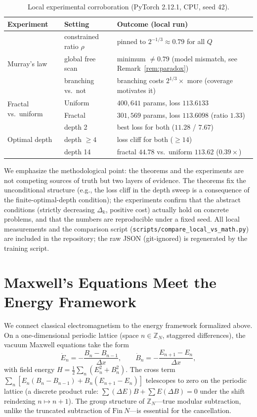 \documentclass[journal]{IEEEtran}
\begin{document}
\begin{table}[!t]
\renewcommand{\arraystretch}{1.2}
\caption{Local experimental corroboration (PyTorch 2.12.1, CPU, seed 42).}
\label{table_experiments}
\centering
\begin{tabular}{@{}ll@{}l@{}}
\toprule
Experiment & Setting & Outcome (local run) \\
\midrule
\multirow{3}{*}{Murray's law}
 & constrained ratio $\rho$ & pinned to $2^{-1/3}\approx0.79$ for all $Q$ \\
 & global free scan & minimum $\not=0.79$ (model mismatch, see Remark~\ref{rem:paradox}) \\
 & branching vs.\ not & branching costs $2^{1/3}\times$ more (coverage motivates it) \\
\midrule
\multirow{2}{*}{Fractal vs.\ uniform}
 & Uniform & $400{,}641$ params, loss $113.6133$ \\
 & Fractal & $301{,}569$ params, loss $113.6098$ (ratio $1.33$) \\
\midrule
\multirow{3}{*}{Optimal depth}
 & depth 2 & best loss for both ($11.28$ / $7.67$) \\
 & depth $\geq4$ & loss cliff for both ($\geq14$) \\
 & depth 14 & fractal $44.78$ vs.\ uniform $113.62$ ($0.39\times$) \\
\bottomrule
\end{tabular}
\end{table}

We emphasize the methodological point: the theorems and the experiments are not
competing sources of truth but two layers of evidence. The theorems fix the
unconditional structure (e.g., the loss cliff in the depth sweep is a
consequence of the finite-optimal-depth condition); the experiments confirm that
the abstract conditions (strictly decreasing $\Delta_k$, positive cost) actually
hold on concrete problems, and that the numbers are reproducible under a fixed
seed. All local measurements and the comparison script
(\texttt{scripts/compare\_local\_vs\_math.py}) are included in the repository;
the raw JSON (git-ignored) is regenerated by the training script.


\section{Maxwell's Equations Meet the Energy Framework}
\label{sec:maxwell}
We connect classical electromagnetism to the energy framework formalized
above. On a one-dimensional periodic lattice (space $n\in\mathbb{Z}_N$,
staggered differences), the vacuum Maxwell equations take the form
\begin{equation}
\label{eq:maxwell-lattice}
\dot E_n = -\frac{B_n - B_{n-1}}{\Delta x},\qquad
\dot B_n = -\frac{E_{n+1} - E_n}{\Delta x},
\end{equation}
with field energy $H = \tfrac12\sum_n (E_n^2 + B_n^2)$. The cross term
$\sum_n [E_n(B_n - B_{n-1}) + B_n(E_{n+1} - E_n)]$ telescopes to zero on the
periodic lattice (a discrete product rule: $\sum(\Delta E)B + \sum E(\Delta B)
= 0$ under the shift reindexing $n\mapsto n+1$). The group structure of
$\mathbb{Z}_N$---true modular subtraction, unlike the truncated subtraction
of $\mathrm{Fin}\ N$---is essential for the cancellation.
\end{document}

